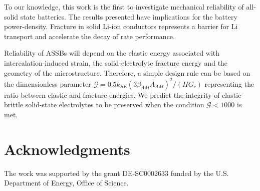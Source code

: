 \documentclass[final,5p,sort&compress]{elsarticle}
\begin{document}
To our knowledge, this work is the first to investigate mechanical reliability of all-solid state batteries. 
The results presented have implications for the battery power-density. Fracture in solid Li-ion conductors represents a barrier for Li transport and accelerate the decay of rate performance.


Reliability of ASSBs will depend on
the elastic energy associated with intercalation-induced strain, the solid-electrolyte fracture energy and the geometry of the microstructure.
Therefore, a simple design rule can be based on the dimensionless parameter 
$ \mathcal{G} = 0.5 k_{SE} (3 \beta_{AM} A_{AM})^2 / (H G_c) $ representing the ratio between elastic and fracture energies.
We predict the integrity of elastic-brittle solid-state electrolytes to be preserved 
when the condition
 $ \mathcal{G} < 1000$ is met.




\section*{Acknowledgments}
The work was supported by the grant DE-SC0002633 funded by the U.S. Department of Energy, Office of Science.






\end{document}
